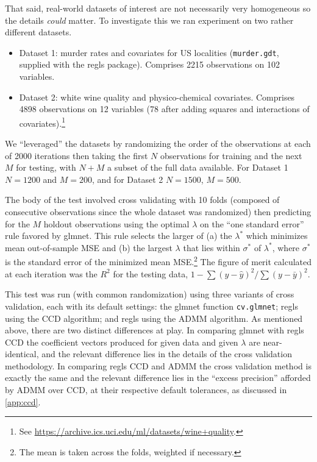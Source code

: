 \documentclass{article}
\begin{document}
That said, real-world datasets of interest are not necessarily very
homogeneous so the details \textit{could} matter. To investigate this
we ran experiment on two rather different datasets.
\begin{itemize}
\item Dataset 1: murder rates and covariates for US localities
  (\texttt{murder.gdt}, supplied with the \textsf{regls} package).
  Comprises 2215 observations on 102 variables.
\item Dataset 2: white wine quality and physico-chemical covariates.
  Comprises 4898 observations on 12 variables (78 after adding squares
  and interactions of covariates).\footnote{See
    \url{https://archive.ics.uci.edu/ml/datasets/wine+quality}.}
\end{itemize}

We ``leveraged'' the datasets by randomizing the order of the
observations at each of 2000 iterations then taking the first $N$
observations for training and the next $M$ for testing, with $N+M$
a subset of the full data available. For Dataset 1 $N=1200$ and
$M=200$, and for Dataset 2 $N=1500$, $M=500$.

The body of the test involved cross validating with 10 folds (composed
of consecutive observations since the whole dataset was randomized)
then predicting for the $M$ holdout observations using the optimal
$\lambda$ on the ``one standard error'' rule favored by
\textsf{glmnet}. This rule selects the larger of (a) the $\lambda^*$
which minimizes mean out-of-sample MSE and (b) the largest $\lambda$
that lies within $\sigma^*$ of $\lambda^*$, where $\sigma^*$ is the
standard error of the minimized mean MSE.\footnote{The mean is taken
  across the folds, weighted if necessary.} The figure of merit
calculated at each iteration was the $R^2$ for the testing data,
$1 - \sum (y-\hat{y})^2 / \sum (y-\bar{y})^2$.

This test was run (with common randomization) using three variants of
cross validation, each with its default settings: the \textsf{glmnet}
function \texttt{cv.glmnet}; \textrm{regls} using the CCD algorithm;
and \textsf{regls} using the ADMM algorithm. As mentioned above, there
are two distinct differences at play. In comparing \textsf{glmnet}
with \textsf{regls} CCD the coefficient vectors produced for given
data and given $\lambda$ are near-identical, and the relevant
difference lies in the details of the cross validation methodology. In
comparing \textsf{regls} CCD and ADMM the cross validation method is
exactly the same and the relevant difference lies in the ``excess
precision'' afforded by ADMM over CCD, at their respective default
tolerances, as discussed in \ref{app:ccd}.
\end{document}
